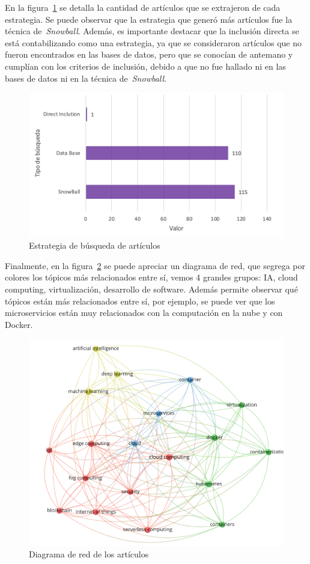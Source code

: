 \noindent
En la figura~\ref{fig:estrategia-busqueda-articulos} se detalla la cantidad de artículos que se extrajeron de cada estrategia. Se puede observar que la estrategia que generó más artículos fue la técnica de~\textit{Snowball}. Además, es importante destacar que la inclusión directa se está contabilizando como una estrategia, ya que se consideraron artículos que no fueron encontrados en las bases de datos, pero que se conocían de antemano y cumplían con los criterios de inclusión, debido a que no fue hallado ni en las bases de datos ni en la técnica de~\textit{Snowball}.
\begin{figure}[H]
    \centering
    \includegraphics[scale=0.8]{tablas-images/cp2/estrategia-busqueda-articulos.png}
    \caption{Estrategia de búsqueda de artículos}\label{fig:estrategia-busqueda-articulos}
\end{figure}
\noindent
Finalmente, en la figura~\ref{fig:diagrama-red-articulos} se puede apreciar un diagrama de red, que segrega por colores los tópicos más relacionados entre sí, vemos 4 grandes grupos: IA, cloud computing, virtualización, desarrollo de software. Además permite observar qué tópicos están más relacionados entre sí, por ejemplo, se puede ver que los microservicios están muy relacionados con la computación en la nube y con Docker.
\begin{figure}[H]
    \centering
    \includegraphics[scale=0.8]{tablas-images/cp2/diagrama-red-busqueda.png}
    \caption{Diagrama de red de los artículos}\label{fig:diagrama-red-articulos}
\end{figure}